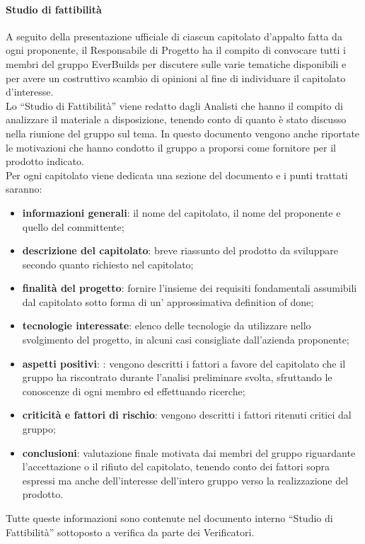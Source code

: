 			\paragraph{Studio di fattibilità}
				A seguito della presentazione ufficiale di ciascun capitolato d’appalto fatta da ogni proponente, il Responsabile di Progetto ha il compito di convocare tutti i membri del gruppo EverBuilds per discutere sulle varie tematiche disponibili e per avere un costruttivo scambio di opinioni al fine di individuare il capitolato d’interesse. \\
				Lo “Studio di Fattibilità” viene redatto dagli Analisti che hanno il compito di analizzare il materiale a disposizione, tenendo conto di quanto è stato discusso nella riunione del gruppo sul tema. In questo documento vengono anche riportate le motivazioni che hanno condotto il gruppo a proporsi come fornitore per il prodotto indicato.\\
				Per ogni capitolato viene dedicata una sezione del documento e i punti trattati saranno:\\
				\begin{itemize}
					\item\textbf{informazioni generali}: il nome del capitolato, il nome del proponente e quello del committente; 
					\item\textbf{descrizione del capitolato}: breve riassunto del prodotto da sviluppare secondo quanto richiesto nel capitolato; 
					\item\textbf{finalità del progetto}: fornire l’insieme dei requisiti fondamentali assumibili dal capitolato sotto forma di un’ approssimativa definition of done; 
					\item\textbf{tecnologie interessate}: elenco delle tecnologie da utilizzare nello svolgimento del progetto, in alcuni casi consigliate dall’azienda proponente; 
					\item\textbf{aspetti positivi}: : vengono descritti i fattori a favore del capitolato che il gruppo ha riscontrato durante l’analisi preliminare svolta, sfruttando le conoscenze di ogni membro ed effettuando ricerche;
					\item\textbf{criticità e fattori di rischio}: vengono descritti i fattori ritenuti critici dal gruppo; 
					\item\textbf{conclusioni}: valutazione finale motivata dai membri del gruppo riguardante l’accettazione o il rifiuto del capitolato, tenendo conto dei fattori sopra espressi ma anche dell’interesse dell’intero gruppo verso la realizzazione del prodotto.
				\end{itemize}
				Tutte queste informazioni sono contenute nel documento interno “Studio di Fattibilità” sottoposto a verifica da parte dei Verificatori.\\
